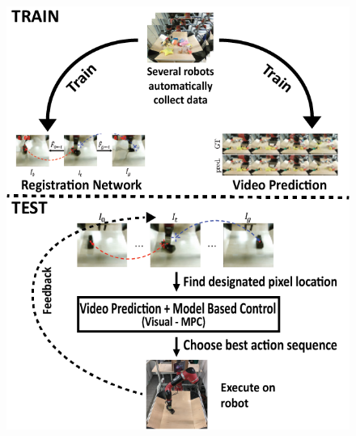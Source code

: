 \begin{figure}[t]
\centering
\includegraphics[width=.8\columnwidth,trim={3.2mm 0 0 0},clip]{images_general/new_overview.png}
\caption{\small{}}
\label{fig:overview}
\end{figure}



